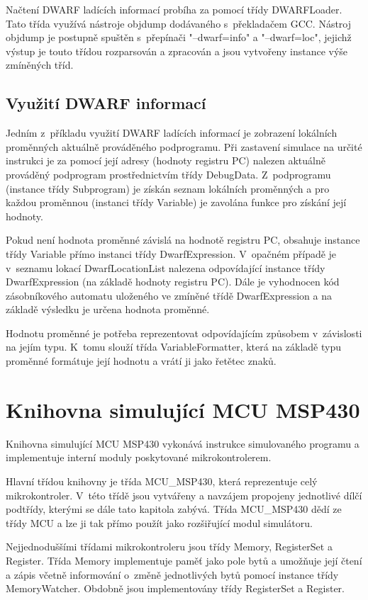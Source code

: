 Načtení DWARF ladících informací probíha za pomocí třídy DWARFLoader. Tato třída využívá nástroje objdump dodávaného s~překladačem GCC. Nástroj objdump je postupně spuštěn s~přepínači "--dwarf=info" a "--dwarf=loc", jejichž výstup je touto třídou rozparsován a zpracován a jsou vytvořeny instance výše zmíněných tříd.

\subsection{Využití DWARF informací}

Jedním z~příkladu využití DWARF ladících informací je zobrazení lokálních proměnných aktuálně prováděného podprogramu. Při zastavení simulace na určité instrukci je za pomocí její adresy (hodnoty registru PC) nalezen aktuálně prováděný podprogram prostřednictvím třídy DebugData. Z~podprogramu (instance třídy Subprogram) je získán seznam lokálních proměnných a pro každou proměnnou (instanci třídy Variable) je zavolána funkce pro získání její hodnoty.

Pokud není hodnota proměnné závislá na hodnotě registru PC, obsahuje instance třídy Variable přímo instanci třídy DwarfExpression. V~opačném případě je v~seznamu lokací DwarfLocationList nalezena odpovídající instance třídy DwarfExpression (na základě hodnoty registru PC). Dále je vyhodnocen kód zásobníkového automatu uloženého ve zmíněné třídě DwarfExpression a na základě výsledku je určena hodnota proměnné.

Hodnotu proměnné je potřeba reprezentovat odpovídajícím způsobem v~závislosti na jejím typu. K~tomu slouží třída VariableFormatter, která na základě typu proměnné formátuje její hodnotu a vrátí ji jako řetětec znaků.

\section{Knihovna simulující MCU MSP430}

Knihovna simulující MCU MSP430 vykonává instrukce simulovaného programu a implementuje interní moduly poskytované mikrokontrolerem.

Hlavní třídou knihovny je třída MCU\_MSP430, která reprezentuje celý mikrokontroler. V~této třídě jsou vytvářeny a navzájem propojeny jednotlivé dílčí podtřídy, kterými se dále tato kapitola zabývá. Třída MCU\_MSP430 dědí ze třídy MCU a lze ji tak přímo použít jako rozšiřující modul simulátoru.

Nejjednoduššími třídami mikrokontroleru jsou třídy Memory, RegisterSet a Register. Třída Memory implementuje paměť jako pole bytů a umožňuje její čtení a zápis včetně informování o~změně jednotlivých bytů pomocí instance třídy MemoryWatcher. Obdobně jsou implementovány třídy RegisterSet a Register.

